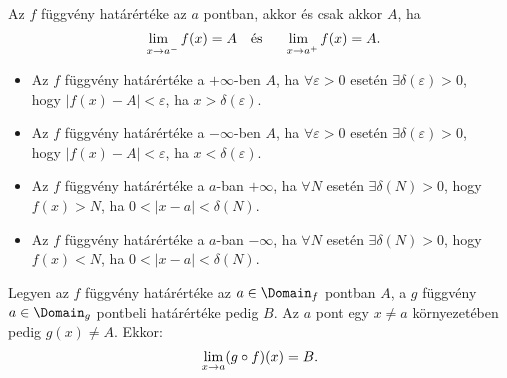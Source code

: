 \begin{theorem}
  Az $f$ függvény határértéke az $a$ pontban, akkor és csak akkor $A$, ha
  \[
    \lim_{\phantom{{}^-}x \rightarrow a^-} f(x) = A
    \quad\text{és}\quad
    \lim_{\phantom{{}^+}x \rightarrow a^+} f(x) = A
    \text.
  \]
\end{theorem}

\begin{definition}
  \begin{itemize}
    \item Az $f$ függvény határértéke a $+\infty$-ben $A$, ha $\forall
            \varepsilon > 0$ esetén $\exists \delta(\varepsilon) > 0$, \\
          hogy $|f(x) - A| < \varepsilon$, ha $x > \delta(\varepsilon)$.

    \item Az $f$ függvény határértéke a $-\infty$-ben $A$, ha $\forall
            \varepsilon > 0$ esetén $\exists \delta(\varepsilon) > 0$, \\
          hogy $|f(x) - A| < \varepsilon$, ha $x < \delta(\varepsilon)$.

    \item Az $f$ függvény határértéke a $a$-ban $+\infty$, ha $\forall N$ esetén
          $\exists \delta(N) > 0$, hogy $f(x) > N$, ha $0 < |x - a| <
            \delta(N)$.

    \item Az $f$ függvény határértéke a $a$-ban $-\infty$, ha $\forall N$ esetén
          $\exists \delta(N) > 0$, hogy $f(x) < N$, ha $0 < |x - a| <
            \delta(N)$.
  \end{itemize}
\end{definition}

\begin{statement}
  Legyen az $f$ függvény határértéke az $a \in \Domain_f$ pontban $A$, a $g$
  függvény $a \in \Domain_g$ pontbeli határértéke pedig $B$. Az $a$ pont egy
  $x \neq a$ környezetében pedig $g(x) \neq A$. Ekkor:
  \[
    \lim_{x \rightarrow a} (g \circ f)(x) = B
    \text.
  \]
\end{statement}